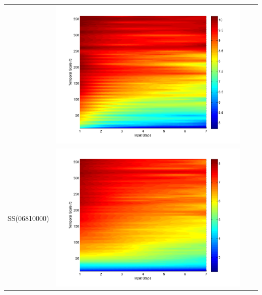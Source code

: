 \documentclass[11pt]{article}
\begin{document}
\begin{table}[H]
{\begin{tabular}{cccc}
&\begin{minipage}{.3\textwidth}\includegraphics[width=\linewidth]{resultgraph/AU/11532500pepq_abs.png}\end{minipage}
\\
SS(06810000)
&\begin{minipage}{.3\textwidth}\includegraphics[width=\linewidth]{resultgraph/AU/06810000p_abs.png}\end{minipage}

\end{tabular}}
\end{table}
\end{document}
